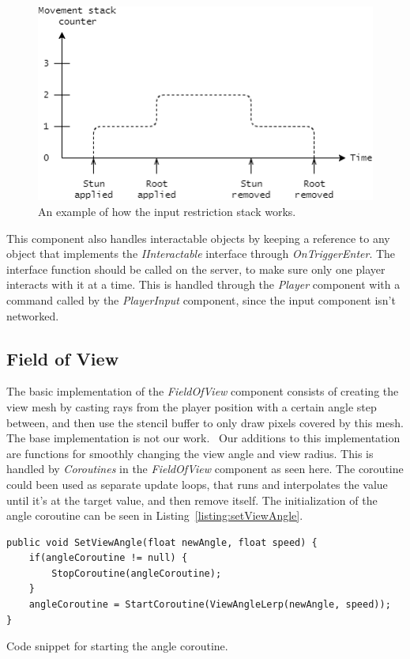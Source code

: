\begin{figure}[htbp]
  \centering
  \includegraphics[width=.8\textwidth]{images/MovementStackCounter}
  \caption[Diagram showing the input restriction stack]{An example of how the input restriction stack works.}
  \label{fig:inputRestrictionStack}
\end{figure}
 


This component also handles interactable objects by keeping a reference to any object that implements the \emph{IInteractable} interface through \emph{OnTriggerEnter}. The interface function should be called on the server, to make sure only one player interacts with it at a time. This is handled through the \emph{Player} component with a command called by the \emph{PlayerInput} component, since the input component isn't networked.

\subsection{Field of View}
\label{sec:fieldOfView}
The basic implementation of the \emph{FieldOfView} component consists of creating the view mesh by casting rays from the player position with a certain angle step between, and then use the stencil buffer to only draw pixels covered by this mesh. The base implementation is not our work.~\cite{fieldOfViewGitHub}
Our additions to this implementation are functions for smoothly changing the view angle and view radius. This is handled by \emph{Coroutines} in the \emph{FieldOfView} component as seen here. The coroutine could been used as separate update loops, that runs and interpolates the value until it's at the target value, and then remove itself. The initialization of the angle coroutine can be seen in Listing~\ref{listing:setViewAngle}.

\begin{listing}[htb]
\begin{verbatim}
public void SetViewAngle(float newAngle, float speed) {
    if(angleCoroutine != null) {
        StopCoroutine(angleCoroutine);
    }
    angleCoroutine = StartCoroutine(ViewAngleLerp(newAngle, speed));
}
\end{verbatim}
\caption[Starting the angle coroutine]{Code snippet for starting the angle coroutine.}
\label{listing:setViewAngle}
\end{listing}

